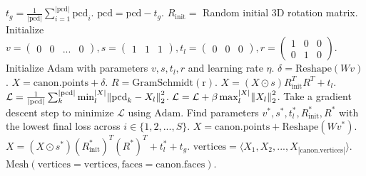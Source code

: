 \begin{algorithm}[H]
\begin{algorithmic}[1]
    \State $t_g = \frac{1}{|\mathrm{pcd}|} \sum_{i=1}^{|\mathrm{pcd}|} \mathrm{pcd}_i$.
    \State $\mathrm{pcd} = \mathrm{pcd} - t_g$. \Comment{\textcolor{blue}{Center the point cloud.}}
        \State $R_{\mathrm{init}} =$ Random initial 3D rotation matrix.
        \State Initialize $v = \begin{pmatrix} 0 & 0 & ... & 0 \end{pmatrix}, s = \begin{pmatrix} 1 & 1 & 1 \end{pmatrix}, t_l = \begin{pmatrix} 0 & 0 & 0 \end{pmatrix}, r = \begin{pmatrix} 1 & 0 & 0 \\ 0 & 1 & 0 \end{pmatrix}$.
        \State Initialize $\mathrm{Adam}$ \cite{kingma17adam} with parameters $v, s, t_l, r$ and learning rate $\eta$.
            \State $\delta = \mathrm{Reshape}(Wv)$.
            \State $X = \mathrm{canon.points} + \delta$. \Comment{\textcolor{blue}{Warped canonical point cloud.}}
            \State $R = \mathrm{GramSchmidt(r)}$.
            \State $X = (X \odot s) R_{\mathrm{init}}^T R^T + t_l$. \Comment{\textcolor{blue}{Scaled, rotated and translated point cloud.}}
            \State $\mathcal{L} = \frac{1}{|\mathrm{pcd}|} \sum_k^{|\mathrm{pcd}|} \min_l^{|X|} \norm{\mathrm{pcd}_k - X_l}_2^2$. \Comment{\textcolor{blue}{One-sided Chamfer distance.}}
            \State $\mathcal{L} = \mathcal{L} + \beta \max_l^{|X|} \norm{X_l}_2^2$. \Comment{\textcolor{blue}{Object size regularization.}}
            \State Take a gradient descent step to minimize $\mathcal{L}$ using $\mathrm{Adam}$.
        \EndFor
    \EndFor
    \State Find parameters $v^*, s^*, t^*_l, R_{\mathrm{init}}^*, R^*$ with the lowest final loss across $i \in \{ 1, 2, ..., S \}$.
    \State $X = \mathrm{canon.points} +\mathrm{Reshape}(W v^*)$.
    \State $X = (X \odot s^*) (R_{\mathrm{init}}^*)^T (R^*)^T + t^*_l + t_g$. \Comment{\textcolor{blue}{Complete point cloud in workspace coordinates.}}
    \State $\mathrm{vertices} = \langle X_1, X_2, ..., X_{|\mathrm{canon.vertices}|} \rangle$. 
    \State \Return $\mathrm{Mesh}(\mathrm{vertices} = \mathrm{vertices}, \mathrm{faces} = \mathrm{canon.faces})$. \Comment{\textcolor{blue}{Warped mesh.}}

\end{algorithmic}

\end{algorithm}